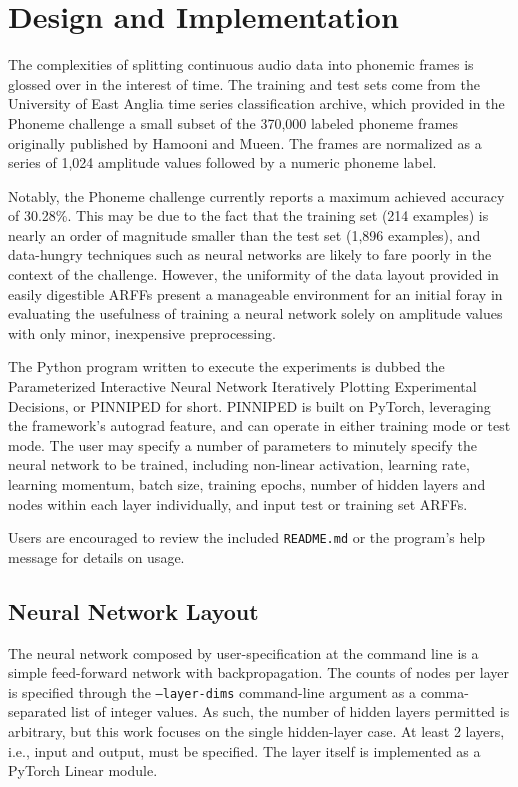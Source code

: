 \documentclass[10pt,epsf]{article}
\begin{document}
\section{Design and Implementation}{
  The complexities of splitting continuous audio data into phonemic frames is glossed
  over in the interest of time. The training and test sets come from the University
  of East Anglia time series classification archive\autocite{ueamvtsca}\autocite{Phoneme},
  which provided in the Phoneme challenge a small subset of the 370,000 labeled phoneme frames originally
  published by Hamooni and Mueen\autocite{DDHCPTS}. The frames are normalized as a series
  of 1,024 amplitude values followed by a numeric phoneme label.

  Notably, the Phoneme challenge currently reports a maximum achieved accuracy of 30.28\%.
  This may be due to the fact that the training set (214 examples) is nearly an order of magnitude smaller than
  the test set (1,896 examples), and data-hungry techniques such as neural networks are likely to fare
  poorly in the context of the challenge. However, the uniformity of the data layout provided in easily
  digestible ARFFs\autocite{scipyloadarff} present a manageable environment for an initial foray in
  evaluating the usefulness of training a neural network solely on amplitude values with only
  minor, inexpensive preprocessing.

  The Python program written to execute the experiments is dubbed the
  Parameterized Interactive Neural Network Iteratively Plotting Experimental Decisions, or PINNIPED for short.
  PINNIPED is built on PyTorch\autocite{torchnnref}\autocite{torchnntut},
  leveraging the framework's autograd feature, and can operate in either training mode or test mode.
  The user may specify a number of parameters to minutely specify the neural network to be trained,
  including non-linear activation, learning rate, learning momentum, batch size, training epochs,
  number of hidden layers and nodes within each layer individually, and input test or training set ARFFs.

  Users are encouraged to review the included \texttt{README.md} or the program's help message
  for details on usage.

  \subsection{Neural Network Layout}{
    The neural network composed by user-specification at the command line is a simple feed-forward
    network with backpropagation\autocite[284-296]{DHS}. The counts of nodes per layer is specified
    through the \texttt{--layer-dims} command-line argument as a comma-separated list of integer values.
    As such, the number of hidden layers permitted is arbitrary, but this work focuses on the single
    hidden-layer case. At least 2 layers, i.e., input and output, must be specified. The layer itself
    is implemented as a PyTorch Linear module.

}}
\end{document}
